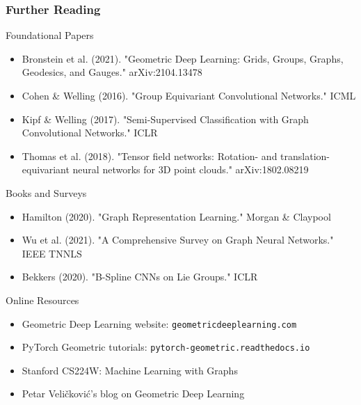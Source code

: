 \begin{frame}[fragile]\frametitle{Further Reading}

\begin{block}{Foundational Papers}
\begin{itemize}
\item Bronstein et al. (2021). "Geometric Deep Learning: Grids, Groups, Graphs, Geodesics, and Gauges." arXiv:2104.13478
\item Cohen \& Welling (2016). "Group Equivariant Convolutional Networks." ICML
\item Kipf \& Welling (2017). "Semi-Supervised Classification with Graph Convolutional Networks." ICLR
\item Thomas et al. (2018). "Tensor field networks: Rotation- and translation-equivariant neural networks for 3D point clouds." arXiv:1802.08219
\end{itemize}
\end{block}

\begin{block}{Books and Surveys}
\begin{itemize}
\item Hamilton (2020). "Graph Representation Learning." Morgan \& Claypool
\item Wu et al. (2021). "A Comprehensive Survey on Graph Neural Networks." IEEE TNNLS
\item Bekkers (2020). "B-Spline CNNs on Lie Groups." ICLR
\end{itemize}
\end{block}

\begin{block}{Online Resources}
\begin{itemize}
\item Geometric Deep Learning website: \texttt{geometricdeeplearning.com}
\item PyTorch Geometric tutorials: \texttt{pytorch-geometric.readthedocs.io}
\item Stanford CS224W: Machine Learning with Graphs
\item Petar Veličković's blog on Geometric Deep Learning
\end{itemize}
\end{block}

\end{frame}